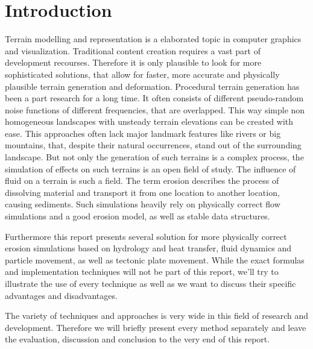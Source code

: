 \section{Introduction}

Terrain modelling  and representation is a elaborated topic in computer graphics and visualization. Traditional content creation requires a vast part of development recourses. Therefore it is only plausible to look for more sophisticated solutions, that allow for faster, more accurate and physically plausible terrain generation and deformation. Procedural terrain generation has been a part research for a long time. It often consists of different pseudo-random noise functions of different frequencies, that are overlapped. This way simple non homogeneous landscapes with unsteady terrain elevations can be created with ease. This approaches often lack major landmark features like rivers or big mountains, that, despite their natural occurrences, stand out of the surrounding landscape. But not only the generation of such terrains is a complex process, the simulation of effects on such terrains is an open field of study. The influence of fluid on a terrain is such a field. The term erosion describes the process of dissolving material and transport it from one location to another location, causing sediments. Such simulations heavily rely on physically correct flow simulations and a good erosion model, as well as stable data structures. 

Furthermore this report presents several solution for more physically correct erosion simulations based on hydrology and heat transfer, fluid dynamics and particle movement, as well as tectonic plate movement. While the exact formulas  and implementation techniques will not be part of this report, we'll try to illustrate the use of every technique as well as we want to discuss their specific advantages and disadvantages.

The variety of techniques and approaches is very wide in this field of research and development. Therefore we will briefly present every method separately and leave the evaluation, discussion and conclusion to the very end of this report.


